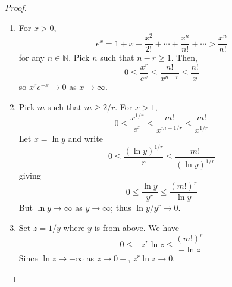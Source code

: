 \documentclass[10pt, a4paper, twoside]{report}
\begin{document}
\begin{proof}\item[] 
    \begin{enumerate}
        \item For \(x>0\),
        \[e^x=1+x+\frac{x^2}{2!}+\cdots+\frac{x^n}{n!}+\cdots>\frac{x^n}{n!}\]
        for any \(n\in\mathbb{N}\). Pick \(n\) such that \(n-r\geq 1\). Then,
        \[0\leq\frac{x^r}{e^x}\leq\frac{n!}{x^{n-r}}\leq\frac{n!}{x}\]
        so \(x^re^{-x}\to 0\) as \(x\to\infty\).
        \item Pick \(m\) such that \(m\geq 2/r\). For \(x>1\),
        \[0\leq\frac{x^{1/r}}{e^x}\leq\frac{m!}{x^{m-1/r}}\leq\frac{m!}{x^{1/r}}\]
        Let \(x=\ln y\) and write 
        \[0\leq\frac{(\ln y)^{1/r}}{r}\leq\frac{m!}{(\ln y)^{1/r}}\]
        giving 
        \[0\leq\frac{\ln y}{y^r}\leq\frac{(m!)^r}{\ln y}\]
        But \(\ln y\to\infty\) as \(y\to\infty\); thus \(\ln y/y^r\to 0\).
        \item Set \(z=1/y\) where \(y\) is from above. We have 
        \[0\leq-z^r\ln z\leq\frac{(m!)^r}{-\ln z}\]
        Since \(\ln z\to-\infty\) as \(z\to 0+\), \(z^r\ln z\to 0\).
    \end{enumerate}
\end{proof}
\end{document}
